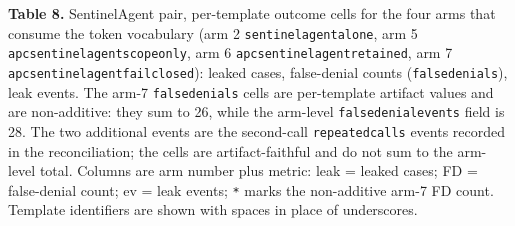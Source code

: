 \documentclass[
  10pt,
]{article}
\let\origtexttt\texttt
\renewcommand{\texttt}[1]{{\upshape\origtexttt{#1}}}
\renewcommand{\_}{\allowbreak\origunderscore}
\begin{document}
\textbf{Table 8.} SentinelAgent pair, per-template outcome cells for the
four arms that consume the token vocabulary (arm 2
\texttt{sentinelagent\_alone}, arm 5
\texttt{apc\_sentinelagent\_scope\_only}, arm 6
\texttt{apc\_sentinelagent\_retained}, arm 7
\texttt{apc\_sentinelagent\_fail\_closed}): leaked cases, false-denial
counts (\texttt{false\_denials}), leak events. The arm-7
\texttt{false\_denials} cells are per-template artifact values and are
non-additive: they sum to 26, while the arm-level
\texttt{false\_denial\_events} field is 28. The two additional events
are the second-call \texttt{repeated\_calls} events recorded in the
reconciliation; the cells are artifact-faithful and do not sum to the
arm-level total. Columns are arm number plus metric: leak = leaked
cases; FD = false-denial count; ev = leak events; \texttt{*} marks the
non-additive arm-7 FD count. Template identifiers are shown with spaces
in place of underscores.
\end{document}
